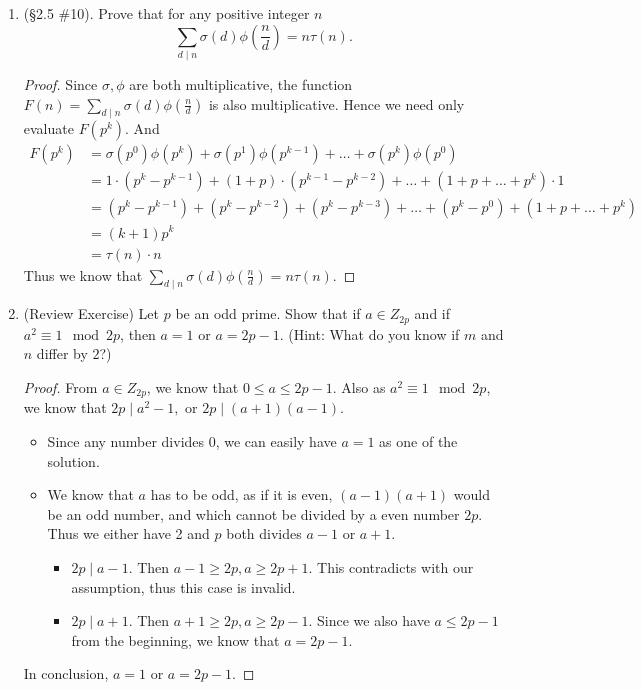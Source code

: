 \documentclass[11pt,a4paper]{article}
\begin{document}
\begin{enumerate}
	\item (\S 2.5 \#10). Prove that for any positive integer \(n\)
	\[ \sum_{d \mid n} \sigma(d)\phi\!\left(\frac{n}{d}\right) = n\tau(n). \]

	\begin{proof}
		Since \(\sigma, \phi\) are both multiplicative, the function $F(n)= \sum_{d \mid n} \sigma(d)\phi\!\left(\frac{n}{d}\right)$ is also multiplicative. Hence we need only evaluate $F(p^k).$ And
		\begin{align*}
		F(p^k) &=  \sigma(p^0)\phi\!\left(p^k\right) + \sigma(p^1)\phi\!\left(p^{k-1}\right) + \ldots + \sigma(p^k)\phi\!\left(p^0\right)\\
		&= 1 \cdot (p^k-p^{k-1}) + (1+p)\cdot (p^{k-1}-p^{k-2}) + \ldots + (1+p+\ldots + p^k)\cdot 1 \\
		&= (p^k-p^{k-1}) + (p^k - p^{k-2}) + (p^k - p^{k-3}) + \ldots + (p^k-p^0) + (1+p+\ldots + p^k) \\
		&= (k+1)p^k \\
		&= \tau(n) \cdot n
		\end{align*}
		Thus we know that \(\sum_{d \mid n} \sigma(d)\phi\!\left(\frac{n}{d}\right) = n\tau(n).\)
	\end{proof}

	\item (Review Exercise) Let \(p\) be an odd prime. Show that if \(a \in Z_{2p}\) and if \(a^{2} \equiv 1 \mod 2p\), then \(a = 1\) or \(a = 2p-1\). (Hint: What do you know if \(m\) and \(n\) differ by \(2\)?)

	\begin{proof}
		From \(a \in Z_{2p}\), we know that $0 \leq a \leq 2p-1.$ Also as \(a^{2} \equiv 1 \mod 2p\), we know that $2p \mid a^2-1,$ or $2p \mid (a+1)(a-1).$
			\begin{itemize}
				\item Since any number divides 0, we can easily have $a=1$ as one of the solution.
				\item We know that $a$ has to be odd, as if it is even, $(a-1)(a+1)$ would be an odd number, and which cannot be divided by a even number $2p.$ Thus we either have 2 and $p$ both divides $a-1$ or $a+1.$
				\begin{itemize}
					\item $2p \mid a-1.$ Then $a-1 \geq 2p, a \geq 2p+1.$ This contradicts with our assumption, thus this case is invalid.
					\item $2p \mid a+1.$ Then $a+1 \geq 2p, a \geq 2p-1.$ Since we also have $a \leq 2p-1$ from the beginning, we know that $a = 2p-1.$
				\end{itemize}
			\end{itemize}
			In conclusion, \(a = 1\) or \(a = 2p-1.\)
	\end{proof}

\end{enumerate}
\end{document}
